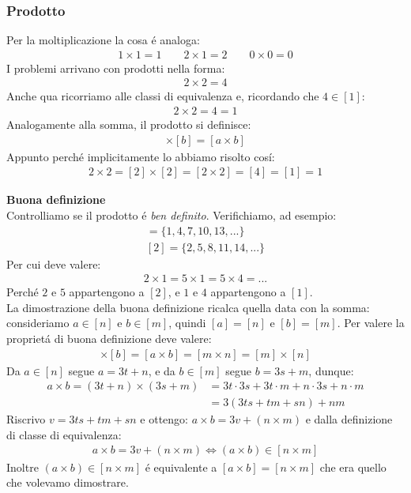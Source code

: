 \documentclass[twoside]{article} %
\begin{document}
	\subsubsection{Prodotto}
	Per la moltiplicazione la cosa \'e analoga:
	\begin{gather*}
		1\times 1=1\qquad 2\times 1=2\qquad 0\times 0=0
	\end{gather*}
	I problemi arrivano con prodotti nella forma:
	\begin{gather*}
		2\times 2=4
	\end{gather*}
	Anche qua ricorriamo alle classi di equivalenza e, ricordando che $4\in [1]$:
	\begin{gather*}
		2\times 2=4=1
	\end{gather*}
	Analogamente alla somma, il prodotto si definisce:
	\begin{gather*}
		[a]\times[b]=[a\times b]
	\end{gather*}
	Appunto perch\'e implicitamente lo abbiamo risolto cos\'i:
	\begin{gather*}
		2\times 2=[2]\times [2]=[2\times 2]=[4]=[1]=1
	\end{gather*}	
	
	{\noindent \large \textbf{Buona definizione}}\\
	Controlliamo se il prodotto \'e \textit{ben definito}. Verifichiamo, ad esempio:
	\begin{gather*}
		[1]=\{1,4,7,10,13,...\}\\
		[2]=\{2,5,8,11,14,...\}
	\end{gather*}
	Per cui deve valere:
	\begin{gather*}
		2\times 1=5\times 1=5\times 4=...
	\end{gather*}
	Perch\'e $2$ e $5$ appartengono a $[2]$, e $1$ e $4$ appartengono a $[1]$. \\
	La dimostrazione della buona definizione ricalca quella data con la somma: consideriamo $a\in [n]$ e $b\in [m]$, quindi $[a]=[n]$ e $[b]=[m]$. Per valere la propriet\'a di buona definizione deve valere:
	\begin{gather*}
		[a]\times[b]=[a\times b]=[m\times n]=[m]\times[n]
	\end{gather*}
	Da $a\in [n]$ segue $a=3t+n$, e da $b\in [m]$ segue $b=3s+m$, dunque:
	\begin{align*}
		a\times b=(3t+n)\times(3s+m)&=3t\cdot 3s+3t\cdot m+n\cdot 3s+n\cdot m\\
									&=3(3ts+tm+sn)+nm
	\end{align*}
	Riscrivo $v=3ts+tm+sn$ e ottengo: $a\times b=3v+(n\times m)$ e dalla definizione di classe di equivalenza:
	\begin{gather*}
		a\times b=3v+(n\times m)\Leftrightarrow (a\times b)\in [n\times m]
	\end{gather*}
	Inoltre $(a \times b)\in [n\times m]$ \'e equivalente a $[a\times b]=[n\times m]$ che era quello che volevamo dimostrare.
	\newpage 
\end{document}
